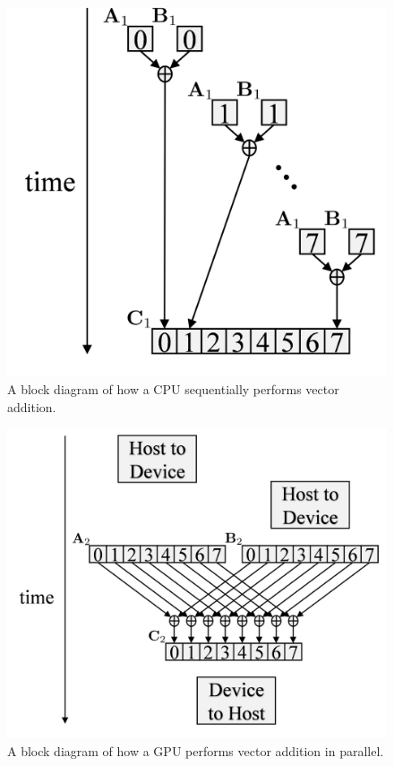 \begin{figure}
	\centering\includegraphics[width=3.17in/100*55]{figures/gpu_intro/CPUaddBlockDiagram.pdf}
	\caption{A block diagram of how a CPU sequentially performs vector addition.}
	\label{fig:CPUaddBlockDiagram}
\end{figure}
\begin{figure}
	\centering\includegraphics[width=4.69in/100*55]{figures/gpu_intro/GPUaddBlockDiagram.pdf}
	\caption{A block diagram of how a GPU performs vector addition in parallel.}
	\label{fig:GPUaddBlockDiagram}
\end{figure}

